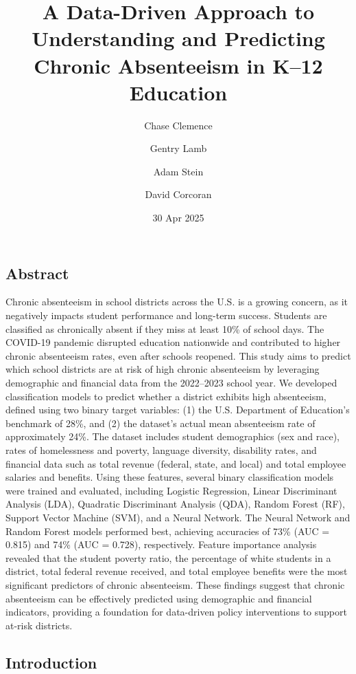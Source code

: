 \documentclass[
  11pt,
]{article}
\title{A Data-Driven Approach to Understanding and Predicting Chronic
Absenteeism in K--12 Education}
\author{Chase Clemence \and Gentry Lamb \and Adam Stein \and David
Corcoran}
\date{30 Apr 2025}
\renewcommand*\contentsname{Table of contents}
\newcommand\contentsname{Table of contents}
\begin{document}
\maketitle

\renewcommand*\contentsname{Table of contents}
{
\hypersetup{linkcolor=}
\setcounter{tocdepth}{2}
\tableofcontents
}

\subsection{Abstract}\label{abstract}

Chronic absenteeism in school districts across the U.S. is a growing
concern, as it negatively impacts student performance and long-term
success. Students are classified as chronically absent if they miss at
least 10\% of school days. The COVID-19 pandemic disrupted education
nationwide and contributed to higher chronic absenteeism rates, even
after schools reopened. This study aims to predict which school
districts are at risk of high chronic absenteeism by leveraging
demographic and financial data from the 2022--2023 school year. We
developed classification models to predict whether a district exhibits
high absenteeism, defined using two binary target variables: (1) the
U.S. Department of Education's benchmark of 28\%, and (2) the dataset's
actual mean absenteeism rate of approximately 24\%. The dataset includes
student demographics (sex and race), rates of homelessness and poverty,
language diversity, disability rates, and financial data such as total
revenue (federal, state, and local) and total employee salaries and
benefits. Using these features, several binary classification models
were trained and evaluated, including Logistic Regression, Linear
Discriminant Analysis (LDA), Quadratic Discriminant Analysis (QDA),
Random Forest (RF), Support Vector Machine (SVM), and a Neural Network.
The Neural Network and Random Forest models performed best, achieving
accuracies of 73\% (AUC = 0.815) and 74\% (AUC = 0.728), respectively.
Feature importance analysis revealed that the student poverty ratio, the
percentage of white students in a district, total federal revenue
received, and total employee benefits were the most significant
predictors of chronic absenteeism. These findings suggest that chronic
absenteeism can be effectively predicted using demographic and financial
indicators, providing a foundation for data-driven policy interventions
to support at-risk districts.

\subsection{Introduction}\label{introduction}
\end{document}
